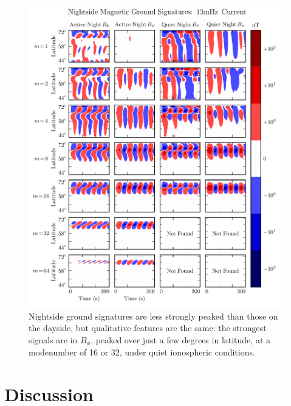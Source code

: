 \begin{figure}[!htb]
    \centering
    \includegraphics[width=\textwidth]{figures/ground_night.pdf}
    \caption[Nightside Ground Magnetic Fields]{
      Nightside ground signatures are less strongly peaked than those on the dayside, but qualitative features are the same: the strongest signals are in $B_\phi$, peaked over just a few degrees in latitude, at a modenumber of 16 or 32, under quiet ionospheric conditions. 
    }
    \label{fig_ground_night}
\end{figure}

\section{Discussion}



